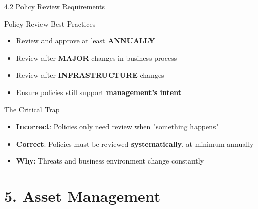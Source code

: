 \documentclass[10pt]{beamer}  %
\begin{document}
	\begin{frame}{4.2 Policy Review Requirements}
		\begin{block}{Policy Review Best Practices}
			\begin{itemize}
				\item Review and approve at least \textbf{ANNUALLY}
				\item Review after \textbf{MAJOR} changes in business process
				\item Review after \textbf{INFRASTRUCTURE} changes
				\item Ensure policies still support \textbf{management's intent}
			\end{itemize}
		\end{block}
		
		\begin{alertblock}{The Critical Trap}
			\begin{itemize}
				\item \textbf{Incorrect}: Policies only need review when "something happens"
				\item \textbf{Correct}: Policies must be reviewed \textbf{systematically}, at minimum annually
				\item \textbf{Why}: Threats and business environment change constantly
			\end{itemize}
		\end{alertblock}
	\end{frame}
	
	\section{5. Asset Management}
	
\end{document}
